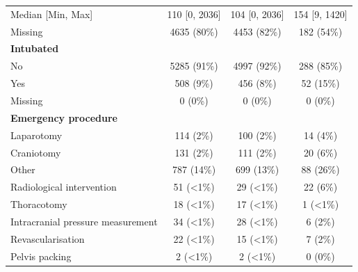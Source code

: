 \documentclass[12pt, a4paper]{article}
\begin{document}
\begin{table}[p]
{\begin{tabular}{lccc}
			\hspace{3mm}Median [Min, Max]                 & 110 [0, 2036]     & 104 [0, 2036]     & 154 [9, 1420]    \\
			\hspace{3mm}Missing                           & 4635 (80\%)       & 4453 (82\%)       & 182 (54\%)       \\
			\textbf{Intubated}                            &                   &                   &                  \\
			\hspace{3mm}No                                & 5285 (91\%)       & 4997 (92\%)       & 288 (85\%)       \\
			\hspace{3mm}Yes                               & 508 (9\%)         & 456 (8\%)         & 52 (15\%)        \\
			\hspace{3mm}Missing                           & 0 (0\%)           & 0 (0\%)           & 0 (0\%)          \\
			\textbf{Emergency procedure}                  &                   &                   &                  \\
			\hspace{3mm}Laparotomy                        & 114 (2\%)         & 100 (2\%)         & 14 (4\%)         \\
			\hspace{3mm}Craniotomy                        & 131 (2\%)         & 111 (2\%)         & 20 (6\%)         \\
			\hspace{3mm}Other                             & 787 (14\%)        & 699 (13\%)        & 88 (26\%)        \\
			\hspace{3mm}Radiological intervention         & 51 (\textless1\%) & 29 (\textless1\%) & 22 (6\%)         \\
			\hspace{3mm}Thoracotomy                       & 18 (\textless1\%) & 17 (\textless1\%) & 1 (\textless1\%) \\
			\hspace{3mm}Intracranial pressure measurement & 34 (\textless1\%) & 28 (\textless1\%) & 6 (2\%)          \\
			\hspace{3mm}Revascularisation                 & 22 (\textless1\%) & 15 (\textless1\%) & 7 (2\%)          \\
			\hspace{3mm}Pelvis packing                    & 2 (\textless1\%)  & 2 (\textless1\%)  & 0 (0\%)          \\

\end{tabular}}
\end{table}
\end{document}
